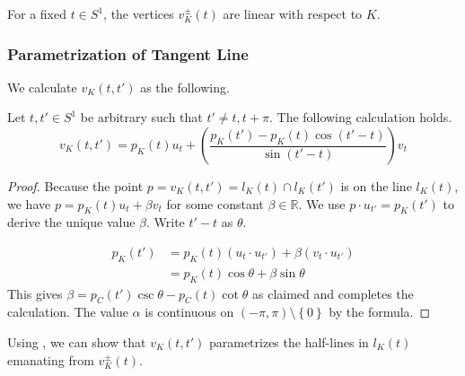 \begin{corollary}

For a fixed \(t \in S^1\), the vertices \(v_K^{\pm}(t)\) are linear with respect to \(K\).

\label{cor:vertex-linear}
\end{corollary}

\subsubsection{Parametrization of Tangent Line}

We calculate \(v_K(t, t')\) as the following.

\begin{lemma}

Let \(t, t' \in S^1\) be arbitrary such that \(t' \neq t, t + \pi\). The following calculation holds.
\[
v_K(t, t') = p_K(t) u_{t} + \left( \frac{p_K(t') - p_K(t) \cos (t' - t)}{\sin (t' - t)} \right)  v_{t}
\]

\label{lem:intersection-tangent-lines}
\end{lemma}

\begin{proof}
Because the point \(p = v_K(t, t') = l_{K}(t) \cap l_K(t')\) is on the line \(l_K(t)\), we have \(p = p_K(t) u_{t} + \beta v_{t}\) for some constant \(\beta \in \mathbb{R}\). We use \(p \cdot u_{t'} = p_K(t')\) to derive the unique value \(\beta\). Write \(t' - t\) as \(\theta\).

\begin{align*}
p_K(t') &= p_K(t) (u_{t} \cdot u_{t'}) + \beta (v_{t} \cdot u_{t'}) \\
&= p_K(t) \cos \theta + \beta \sin \theta
\end{align*}
This gives \(\beta = p_C(t') \csc \theta - p_C(t) \cot \theta\) as claimed and completes the calculation. The value \(\alpha\) is continuous on \((-\pi, \pi) \setminus \left\{ 0 \right\}\) by the formula.
\end{proof}

Using , we can show that \(v_K(t, t')\) parametrizes the half-lines in \(l_K(t)\) emanating from \(v_K^{\pm}(t)\).

